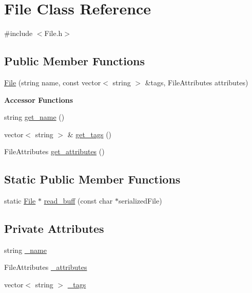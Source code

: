 \hypertarget{class_file}{}\section{File Class Reference}
\label{class_file}


{\ttfamily \#include $<$File.\+h$>$}

\subsection*{Public Member Functions}
\begin{DoxyCompactItemize}
\item 
\mbox{\hyperlink{class_file_af29e498f601951f4ccf06f2fc3fb1f73}{File}} (string name, const vector$<$ string $>$ \&tags, File\+Attributes attributes)
\end{DoxyCompactItemize}
\begin{Indent}\textbf{ Accessor Functions}\par
\begin{DoxyCompactItemize}
\item 
string \mbox{\hyperlink{class_file_a4b8e86f4fae0219744cf82f6bab35b53}{get\+\_\+name}} ()
\item 
vector$<$ string $>$ \& \mbox{\hyperlink{class_file_a479270bfe1fa436d317151ac108eb28a}{get\+\_\+tags}} ()
\item 
File\+Attributes \mbox{\hyperlink{class_file_a9f59d3d546e8e574889558d63c71bf02}{get\+\_\+attributes}} ()
\end{DoxyCompactItemize}
\end{Indent}
\subsection*{Static Public Member Functions}
\begin{DoxyCompactItemize}
\item 
static \mbox{\hyperlink{class_file}{File}} $\ast$ \mbox{\hyperlink{class_file_a1118d477e6b00d789e948e8cca5ae393}{read\+\_\+buff}} (const char $\ast$serialized\+File)
\end{DoxyCompactItemize}
\subsection*{Private Attributes}
\begin{DoxyCompactItemize}
\item 
string \mbox{\hyperlink{class_file_a9668b6d84f8f57a737e30d87f08725cd}{\+\_\+name}}
\item 
File\+Attributes \mbox{\hyperlink{class_file_ae2faf26750f73c5848cf414f208282b2}{\+\_\+attributes}}
\item 
vector$<$ string $>$ \mbox{\hyperlink{class_file_aa4bc599b81fee53fd7b7b9d7f8129e11}{\+\_\+tags}}
\end{DoxyCompactItemize}


